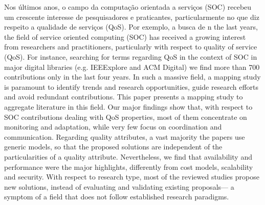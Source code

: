 \documentclass[12pt]{article}
\begin{document}
\begin{resumo}
  Nos últimos anos, o campo da computação orientada a serviços (SOC) recebeu um crescente interesse de pesquisadores e praticantes, particularmente no que diz respeito a qualidade de serviços (QoS). Por exemplo, a busca de 
  n the last years, the field of service oriented computing (SOC) has received a growing interest from researchers and practitioners, particularly with respect to quality of service (QoS). For instance, searching for terms regarding QoS in the context of SOC in major digital libraries (e.g. IEEExplore and ACM Digital) we find more than 700 contributions only in the last four years. In such a massive field, a mapping study is paramount to identify trends and research opportunities, guide research efforts and avoid redundant contributions. This paper presents a mapping study to aggregate literature in this field. Our major findings show that, with respect to SOC contributions dealing with QoS properties, most of them concentrate on monitoring and adaptation, while very few focus on coordination and communication. Regarding quality attributes, a vast majority the papers use generic models, so that the proposed solutions are independent of the particularities of a quality attribute. Nevertheless, we find that availability and performance were the major highlights, differently from cost models, scalability and security. With respect to research type, most of the reviewed studies propose new solutions, instead of evaluating and validating existing proposals--- a symptom of a field that does not follow established research paradigms.
\end{resumo}




    











\end{document}
